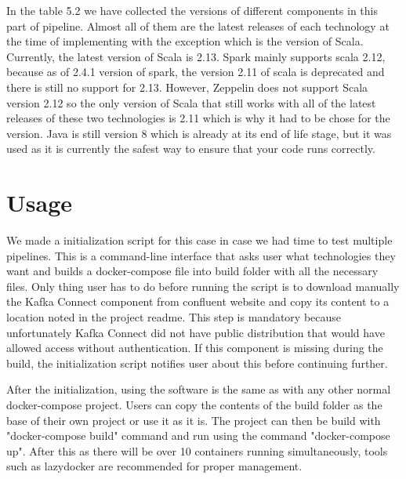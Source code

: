 In the table 5.2 we have collected the versions of different components in this part of pipeline.
Almost all of them are the latest releases of each technology at the time of implementing with the exception which is the version of Scala.
Currently, the latest version of Scala is 2.13.
Spark mainly supports scala 2.12, because as of 2.4.1 version of spark, the version 2.11 of scala is deprecated and there is still no support for 2.13.
However, Zeppelin does not support Scala version 2.12 so the only version of Scala that still works with all of the latest releases of these two technologies is 2.11 which is why it had to be chose for the version.
Java is still version 8 which is already at its end of life stage, but it was used as it is currently the safest way to ensure that your code runs correctly.

\section{Usage}

We made a initialization script for this case in case we had time to test multiple pipelines.
This is a command-line interface that asks user what technologies they want and builds a docker-compose file into build folder with all the necessary files.
Only thing user has to do before running the script is to download manually the Kafka Connect component from confluent website and copy its content to a location noted in the project readme. 
This step is mandatory because unfortunately Kafka Connect did not have public distribution that would have allowed access without authentication.
If this component is missing during the build, the initialization script notifies user about this before continuing further.

After the initialization, using the software is the same as with any other normal docker-compose project.
Users can copy the contents of the build folder as the base of their own project or use it as it is.
The project can then be build with "docker-compose build" command and run using the command "docker-compose up".
After this as there will be over 10 containers running simultaneously, tools such as lazydocker are recommended for proper management.

